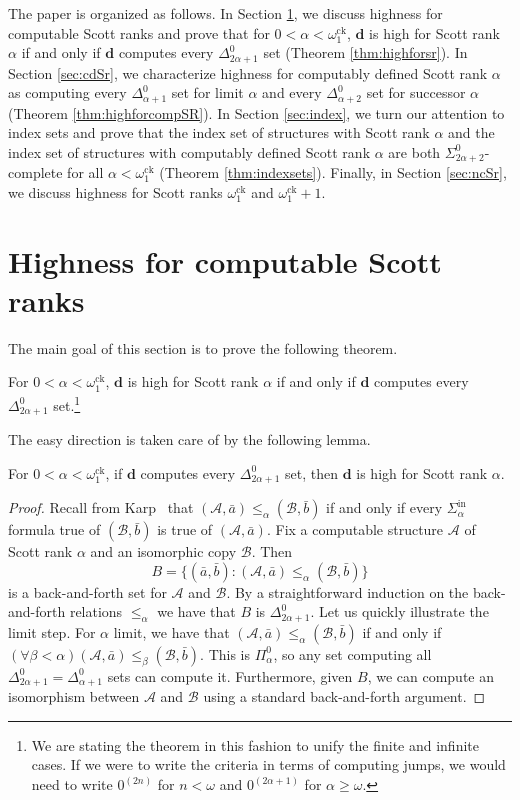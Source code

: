 \documentclass{amsart}
\newcommand\+[1]{\mathcal{#1}}
\renewcommand\*[1]{\mathbf{#1}}
\renewcommand\=[1]{\text{#1}}
\renewcommand\*[1]{\mathbf{#1}}
\newcommand{\A}{\mathcal{A}}
\newcommand{\B}{\mathcal{B}}
\newcommand{\Sinf}[1]{\Sigma^{\mathrm{in}}_{#1}}
\newcommand{\ock}{\omega_{1}^{\mathrm{ck}}}
\begin{document}
The paper is organized as follows. In Section \ref{sec:cSr}, we discuss highness for computable Scott ranks and prove that for $0 < \alpha < \ock$, $\*d$ is high for Scott rank $\alpha$ if and only if $\*d$ computes every $\Delta^0_{2\alpha+1}$ set (Theorem \ref{thm:highforsr}).  In Section \ref{sec:cdSr}, we characterize highness for computably defined Scott rank $\alpha$ as computing every $\Delta^0_{\alpha+1}$ set for limit $\alpha$ and every $\Delta^0_{\alpha+2}$ set for successor $\alpha$ (Theorem \ref{thm:highforcompSR}). In Section \ref{sec:index}, we turn our attention to index sets and prove that the index set of structures with Scott rank $\alpha$ and the index set of structures with computably defined Scott rank $\alpha$ are both $\Sigma^0_{2\alpha+2}$-complete for all $\alpha< \ock$ (Theorem \ref{thm:indexsets}). Finally, in Section \ref{sec:ncSr}, we discuss highness for Scott ranks $\ock$ and $\ock+1$.


\section{Highness for computable Scott ranks}\label{sec:cSr}
The main goal of this section is to prove the following theorem.
\begin{theorem}\label{thm:highforsr}
For $0 < \alpha < \ock$, $\*d$ is high for Scott rank $\alpha$ if and only if $\*d$ computes every $\Delta^0_{2\alpha+1}$ set.\footnote{We are stating the theorem in this fashion to unify the finite and infinite cases.  If we were to write the criteria in terms of computing jumps, we would need to write $0^{(2n)}$ for $n < \omega$ and $0^{(2\alpha+1)}$ for $\alpha \ge \omega$.}
\end{theorem}


The easy direction is taken care of by the following lemma.
\begin{lemma}
  For $0<\alpha<\ock$, if $\*d$ computes every $\Delta^0_{2\alpha+1}$ set, then $\*d$ is high for Scott rank $\alpha$.
\end{lemma}
\begin{proof}
  Recall from Karp~\cite{karp1965b} that $(\A,\bar a)\leq_\alpha (\B,\bar b)$ if and only if every $\Sinf{\alpha}$ formula true of $(\B,\bar b)$ is true of $(\A,\bar a)$. Fix a computable structure $\A$ of Scott rank $\alpha$ and an isomorphic copy $\B$. Then 
  \[ B=\{ (\bar a,\bar b) \colon (\A, \bar a)\leq_\alpha (\B, \bar b)\}\]
  is a back-and-forth set for $\A$ and $\B$. By a straightforward induction on the back-and-forth relations $\leq_\alpha$ we have that $B$ is $\Delta_{2\alpha+1}^0$. Let us quickly illustrate the limit step. For $\alpha$ limit, we have that $(\A, \bar a)\leq_\alpha (\B, \bar b)$ if and only if $(\forall \beta<\alpha) (\A,\bar a)\leq_\beta (\B,\bar b)$. This is $\Pi^0_{\alpha}$, so any set computing all $\Delta_{2\alpha+1}^0=\Delta_{\alpha+1}^0$ sets can compute it. Furthermore, given $B$, we can compute an isomorphism between $\A$ and $\B$ using a standard back-and-forth argument.
\end{proof}
\end{document}
